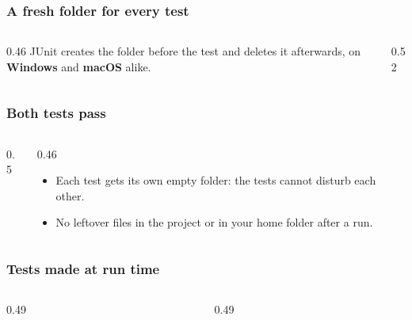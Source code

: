 \documentclass[aspectratio=169,10pt,compress]{beamer}
\newcommand{\win}{\textbf{Windows}}
\newcommand{\mac}{\textbf{macOS}}
\begin{document}
\begin{frame}[t,fragile] \frametitle{A fresh folder for every test}
  \begin{columns}[T]
    \begin{column}{0.46\textwidth}
      \small JUnit creates the folder before the test and deletes it afterwards, on \win{} and \mac{} alike.
    \end{column}
    \begin{column}{0.52\textwidth}
    \end{column}
  \end{columns}
\end{frame}




\begin{frame}[t,fragile] \frametitle{Both tests pass}
  \begin{columns}[T]
    \begin{column}{0.5\textwidth}
    \end{column}
    \begin{column}{0.46\textwidth}
      \begin{itemize}\small
        \item Each test gets its own empty folder: the tests cannot disturb each other.
        \item No leftover files in the project or in your home folder after a run.
      \end{itemize}
    \end{column}
  \end{columns}
\end{frame}





\begin{frame}[t,fragile] \frametitle{Tests made at run time}
  \begin{columns}[T]
    \begin{column}{0.49\textwidth}
    \end{column}
    \begin{column}{0.49\textwidth}
    \end{column}
  \end{columns}
\end{frame}
\end{document}
